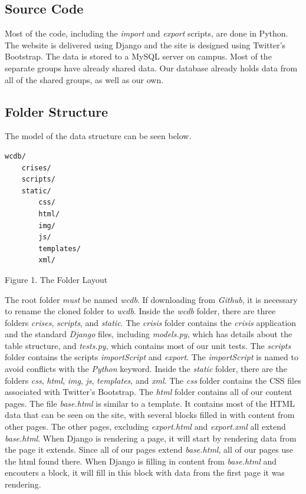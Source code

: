 \documentclass[12pt]{report}
\begin{document}
\subsection*{Source Code}
Most of the code, including the \emph{import} and \emph{export} scripts, are done in Python.
The website is delivered using Django and the site is designed using Twitter's Bootstrap.
The data is stored to a MySQL server on campus.
Most of the separate groups have already shared data.
Our database already holds data from all of the shared groups, as well as our own.

\subsection*{Folder Structure}
The model of the data structure can be seen below.

\hfill \newline
{}
\begin{lstlisting}
wcdb/
    crises/
    scripts/
    static/
        css/
        html/
        img/
        js/
        templates/
        xml/
\end{lstlisting}
\footnotesize Figure 1. The Folder Layout \normalsize

The root folder \emph{must} be named \emph{wcdb}.
If downloading from \emph{Github}, it is necessary to rename the cloned folder to \emph{wcdb}.
Inside the \emph{wcdb} folder, there are three folders \emph{crises}, \emph{scripts}, and \emph{static}.
The \emph{crisis} folder contains the \emph{crisis} application and the standard \emph{Django} files,
including \emph{models.py}, which has details about the table structure, and \emph{tests.py}, which contains
most of our unit tests.
The \emph{scripts} folder contains the scripts \emph{importScript} and \emph{export}.
The \emph{importScript} is named to avoid conflicts with the \emph{Python} keyword.
Inside the \emph{static} folder, there are the folders \emph{css}, \emph{html}, \emph{img}, \emph{js}, \emph{templates}, and \emph{xml}.
The \emph{css} folder contains the CSS files associated with Twitter's Bootstrap.
The \emph{html} folder contains all of our content pages.
The file \emph{base.html} is similar to a template.
It contains most of the HTML data that can be seen on the site, with several blocks filled in with content from other pages.
The other pages, excluding \emph{export.html} and \emph{export.xml} all extend \emph{base.html}.
When Django is rendering a page, it will start by rendering data from the page it extends.
Since all of our pages extend \emph{base.html}, all of our pages use the html found there.
When Django is filling in content from \emph{base.html} and encouters a block,
it will fill in this block with data from the first page it was rendering.
\end{document}
